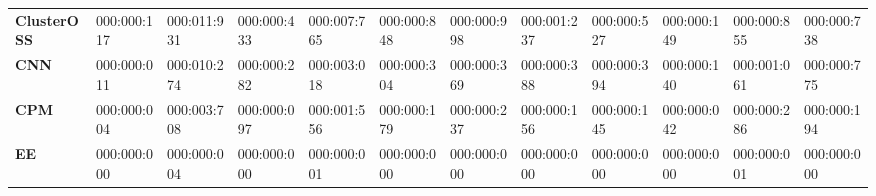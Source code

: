 {{\begin{tabular}{llllllllllll}
\textbf{ClusterOSS}           & 000:000:117                                                                            & 000:011:931                                                                          & 000:000:433                         & 000:007:765                           & 000:000:848                                                                                      & 000:000:998                           & 000:001:237                           & 000:000:527                           & 000:000:149                            & 000:000:855                         & 000:000:738                                                                          \\
\textbf{CNN}                  & 000:000:011                                                                            & 000:010:274                                                                          & 000:000:282                         & 000:003:018                           & 000:000:304                                                                                      & 000:000:369                           & 000:000:388                           & 000:000:394                           & 000:000:140                            & 000:001:061                         & 000:000:775                                                                          \\
\textbf{CPM}                  & 000:000:004                                                                            & 000:003:708                                                                          & 000:000:097                         & 000:001:556                           & 000:000:179                                                                                      & 000:000:237                           & 000:000:156                           & 000:000:145                           & 000:000:042                            & 000:000:286                         & 000:000:194                                                                          \\
\textbf{EE}                   & 000:000:000                                                                            & 000:000:004                                                                          & 000:000:000                         & 000:000:001                           & 000:000:000                                                                                      & 000:000:000                           & 000:000:000                           & 000:000:000                           & 000:000:000                            & 000:000:001                         & 000:000:000                                                                          \\

\end{tabular}}}
